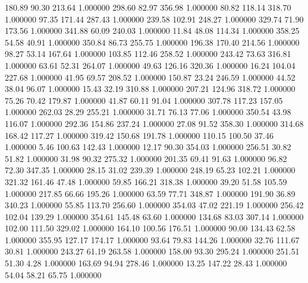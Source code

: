     180.89     90.30    213.64  1.000000
    298.60     82.97    356.98  1.000000
     80.82    118.14    318.70  1.000000
     97.35    171.44    287.43  1.000000
    239.58    102.91    248.27  1.000000
    329.74     71.90    173.56  1.000000
    341.88     60.09    240.03  1.000000
     11.84     48.08    114.34  1.000000
    358.25     54.58     40.91  1.000000
    350.84     86.73    255.75  1.000000
    196.38    170.40    214.56  1.000000
     98.27     53.14    167.64  1.000000
    103.85    112.46    258.52  1.000000
    243.42     73.63    316.81  1.000000
     63.61     52.31    264.07  1.000000
     49.63    126.16    320.36  1.000000
     16.24    104.04    227.68  1.000000
     41.95     69.57    208.52  1.000000
    150.87     23.24    246.59  1.000000
     44.52     38.04     96.07  1.000000
     15.43     32.19    310.88  1.000000
    207.21    124.96    318.72  1.000000
     75.26     70.42    179.87  1.000000
     41.87     60.11     91.04  1.000000
    307.78    117.23    157.05  1.000000
    262.03     28.29    255.21  1.000000
     31.71     76.13     77.06  1.000000
    350.54     43.98    116.07  1.000000
    292.36    154.86    237.24  1.000000
     27.08     91.52    358.30  1.000000
    314.68    168.42    117.27  1.000000
    319.42    150.68    191.78  1.000000
    110.15    100.50     37.46  1.000000
      5.46    100.63    142.43  1.000000
     12.17     90.30    354.03  1.000000
    256.51     30.82     51.82  1.000000
     31.98     90.32    275.32  1.000000
    201.35     69.41     91.63  1.000000
     96.82     72.30    347.35  1.000000
     28.15     31.02    239.39  1.000000
    248.19     65.23    102.21  1.000000
    321.32    161.46     47.48  1.000000
     59.85    166.21    318.38  1.000000
     39.20     51.58    105.59  1.000000
    217.85     66.66    195.26  1.000000
     63.59     77.71    348.87  1.000000
    191.90     36.89    340.23  1.000000
     55.85    113.70    256.60  1.000000
    354.03     47.02    221.19  1.000000
    256.42    102.04    139.29  1.000000
    354.61    145.48     63.60  1.000000
    134.68     83.03    307.14  1.000000
    102.00    111.50    329.02  1.000000
    164.10    100.56    176.51  1.000000
     90.00    134.43     62.58  1.000000
    355.95    127.17    174.17  1.000000
     93.64     79.83    144.26  1.000000
     32.76    111.67     30.81  1.000000
    243.27     61.19    263.58  1.000000
    158.00     93.30    295.24  1.000000
    251.51     51.30      4.28  1.000000
    163.69     94.94    278.46  1.000000
     13.25    147.22     28.43  1.000000
     54.04     58.21     65.75  1.000000
